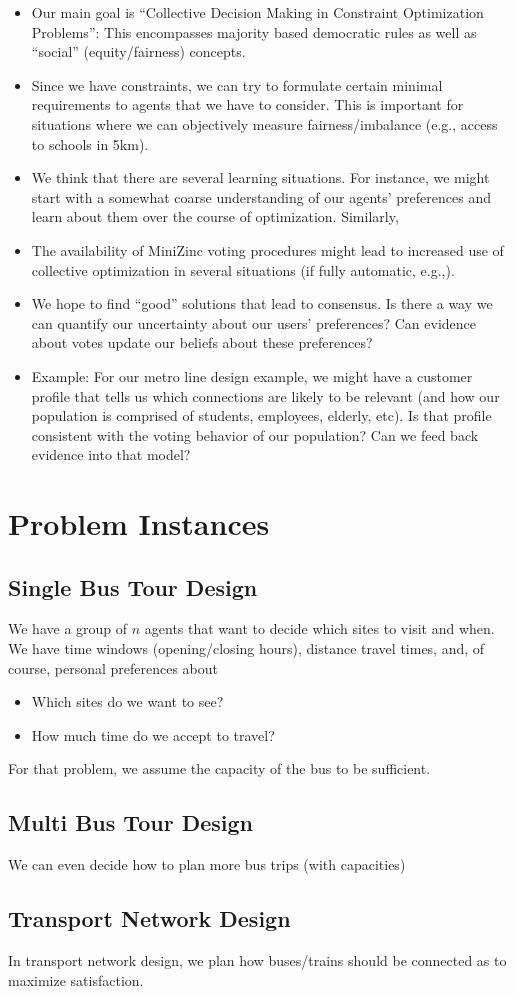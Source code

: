 \documentclass[10pt,a4paper,fleqn]{article}
\begin{document}
\begin{itemize}
\item Our main goal is ``Collective Decision Making in Constraint Optimization Problems'': This encompasses majority based 
democratic rules as well as ``social'' (equity/fairness) concepts.
\item Since we have constraints, we can try to formulate certain minimal requirements to agents that we have to consider. 
This is important for situations where we can objectively measure fairness/imbalance (e.g.,  access to schools in 5km).
\item We think that there are several learning situations. For instance, we might start with a somewhat coarse understanding 
of our agents' preferences and learn about them over the course of optimization. Similarly, 
\item The availability of MiniZinc voting procedures might lead to increased use of collective optimization in several situations (if fully automatic, e.g.,).
\item We hope to find ``good'' solutions that lead to consensus. Is there a way we can quantify our uncertainty about our users' preferences? Can evidence about votes update our beliefs about these preferences?
\item Example: For our metro line design example, we might have a customer profile that tells us which connections are likely to be relevant (and how our population is comprised of students, employees, elderly, etc). Is that profile consistent with the voting behavior of our population? Can we feed back evidence into that model?

\end{itemize}

\section{Problem Instances}

\subsection{Single Bus Tour Design}
We have a group of $n$ agents that want to decide which sites to visit and when. We have time windows (opening/closing hours), distance travel times, and, of course, personal preferences about
\begin{itemize}
\item Which sites do we want to see? 
\item How much time do we accept to travel?
\end{itemize}
For that problem, we assume the capacity of the bus to be sufficient.

\subsection{Multi Bus Tour Design}
We can even decide how to plan more bus trips (with capacities)
\subsection{Transport Network Design}
In transport network design, we plan how buses/trains should be connected as to maximize satisfaction.
\end{document}
